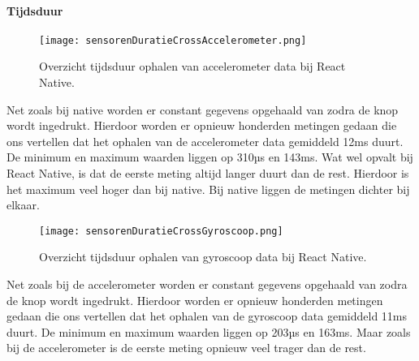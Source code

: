 \paragraph{Tijdsduur}
\begin{figure}[H]
    \centering
    \texttt{[image: sensorenDuratieCrossAccelerometer.png]}
    \caption{Overzicht tijdsduur ophalen van accelerometer data bij React Native.}
\end{figure}
Net zoals bij native worden er constant gegevens opgehaald van zodra de knop wordt ingedrukt. 
Hierdoor worden er opnieuw honderden metingen gedaan die ons vertellen dat het ophalen
van de accelerometer data gemiddeld 12ms duurt. De minimum en maximum waarden liggen op 310µs en 143ms.
Wat wel opvalt bij React Native, is dat de eerste meting altijd langer duurt dan de rest. 
Hierdoor is het maximum veel hoger dan bij native. Bij native liggen de metingen dichter bij elkaar. 
\begin{figure}[H]
    \centering
    \texttt{[image: sensorenDuratieCrossGyroscoop.png]}
    \caption{Overzicht tijdsduur ophalen van gyroscoop data bij React Native.}
\end{figure}
Net zoals bij de accelerometer worden er constant gegevens opgehaald van zodra de knop wordt ingedrukt. 
Hierdoor worden er opnieuw honderden metingen gedaan die ons vertellen dat het ophalen
van de gyroscoop data gemiddeld 11ms duurt. De minimum en maximum waarden liggen op 203µs en 163ms.
Maar zoals bij de accelerometer is de eerste meting opnieuw veel trager dan de rest.

